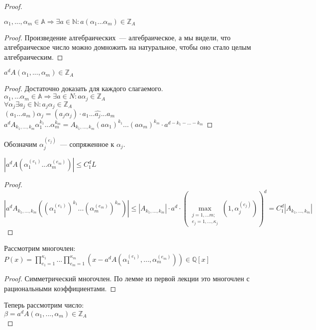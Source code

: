 \begin{proof}
\begin{stm}
$\alpha_1,...,\alpha_m \in \mathbb{A} \Rightarrow \exists a\in\mathbb{N} : a(\alpha_1...\alpha_m) \in\mathbb{Z}_A$
\end{stm}
\begin{proof}
Произведение алгебраических~--- алгебраическое, а мы видели, что алгебраическое число можно домножить на натуральное, чтобы оно стало целым алгебраическим.
\end{proof}
\begin{stm}
$a^d A(\alpha_1,...,\alpha_m) \in \mathbb{Z}_A$
\end{stm}
\begin{proof}
Достаточно доказать для каждого слагаемого.\\
$\alpha_1,...\alpha_m \in \mathbb{A} \Rightarrow \exists a\in{N} : a\alpha_j \in \mathbb{Z}_A$\\
$\forall \alpha_j \exists a_j \in \mathbb{N} : a_j\alpha_j \in\mathbb{Z}_A$\\
$(a_1...a_m)\alpha_j = (a_j\alpha_j)\cdot a_1...\widehat{a_j}...a_m$
$a^d A_{k_1,...,k_m} \alpha_1^{k_1}...\alpha_m^{k_m} = A_{k_1,...,k_m} (a\alpha_1)^{k_1}...(a\alpha_m)^{k_m}\cdot a^{d - k_1 - ... - k_m}$
\end{proof}
Обозначим $\alpha_j^{(e_j)} $~--- сопряженное к $\alpha_j$.
\begin{stm}
$| a^d A(\alpha_1^{(e_1)}...\alpha_m^{(e_m)}) | \leqslant C_1^d L$
\end{stm}
\begin{proof}
$| a^d A_{k_1,...,k_m}( (\alpha_1^{(e_1)})^{k_1}...(\alpha_m^{(e_m)})^{k_m} ) | \leqslant 
| A_{k_1,...,k_m} |\cdot a^d\cdot (\max\limits_{\substack{j = 1,...m;\\e_j = 1,...,\kappa_j}} (1,\alpha_j^{(e_j)} ) )^d =
C_1^d | A_{k_1,...,k_m} |$
\end{proof}
\begin{stm}
Рассмотрим многочлен:\\
 $P(x) = \prod\limits_{e_1 = 1}^{\kappa_1}...\prod\limits_{e_m = 1}^{\kappa_m}(x - a^d A(\alpha_1^{(e_1)},...,\alpha_m^{(e_m)}) ) \in\mathbb{Q}[x]$
\end{stm}
\begin{proof}
Симметрический многочлен. По лемме из первой лекции это многочлен с рациональными коэффициентами.
\end{proof}
Теперь рассмотрим число: \\
$\beta = a^d A(\alpha_1,...,\alpha_m) \in \mathbb{Z}_A$\\

\end{proof}
